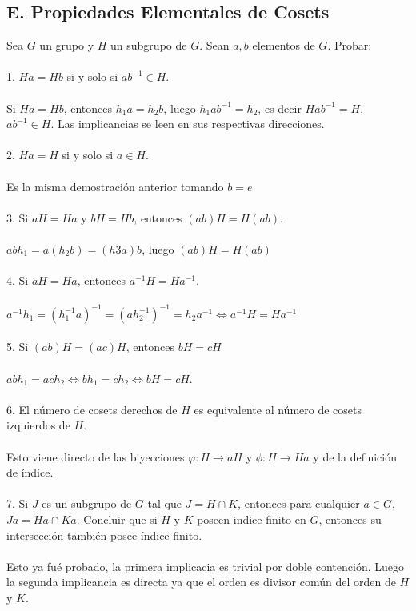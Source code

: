 \documentclass{article}
\begin{document}
\subsection*{E. Propiedades Elementales de Cosets}
Sea $G$ un grupo y $H$ un subgrupo de $G$. Sean $a,b$ elementos de $G$. Probar:
\\
\\
1. $Ha=Hb$ si y solo si $ab^{-1} \in H$.
\\
\\
Si $Ha=Hb$, entonces $h_{1}a=h_{2}b$, luego $h_{1}ab^{-1}=h_{2}$, es decir $Hab^{-1}=H$, $ab^{-1}\in H$. Las implicancias se leen en sus respectivas direcciones.
\\
\\
2. $Ha=H$ si y solo si $a \in H$.
\\
\\
Es la misma demostración anterior tomando $b=e$
\\
\\
3. Si $aH=Ha$ y $bH=Hb$, entonces $(ab)H=H(ab)$.
\\
\\
$abh_1=a(h_2b)=(h3a)b$, luego $(ab)H=H(ab)$
\\
\\
4. Si $aH=Ha$, entonces $a^{-1}H=Ha^{-1}$.
\\
\\
$a^{-1}h_1=(h_1^{-1}a)^{-1}=(ah_{2}^{-1})^{-1}=h_{2}a^{-1} \Longleftrightarrow a^{-1}H=Ha^{-1}$
\\
\\
5. Si $(ab)H=(ac)H$, entonces $bH=cH$
\\
\\
$abh_{1}=ach_{2} \Longleftrightarrow bh_{1}=ch_{2} \Longleftrightarrow bH=cH$.
\\
\\
6. El número de cosets derechos de $H$ es equivalente al número de cosets izquierdos de $H$. 
\\
\\
Esto viene directo de las biyecciones $\varphi: H \to aH$ y $\phi: H \to Ha$ y de la definición de índice.
\\
\\
7. Si $J$ es un subgrupo de $G$ tal que $J=H \cap K$, entonces para cualquier $a \in G$, $Ja=Ha \cap Ka$. Concluir que si $H$ y $K$ poseen indice finito en $G$, entonces su intersección también posee índice finito.
\\
\\
Esto ya fué probado, la primera implicacia es trivial por doble contención, Luego la segunda implicancia es directa ya que el orden es divisor común del orden de $H$ y $K$.
\\
\\
\end{document}
